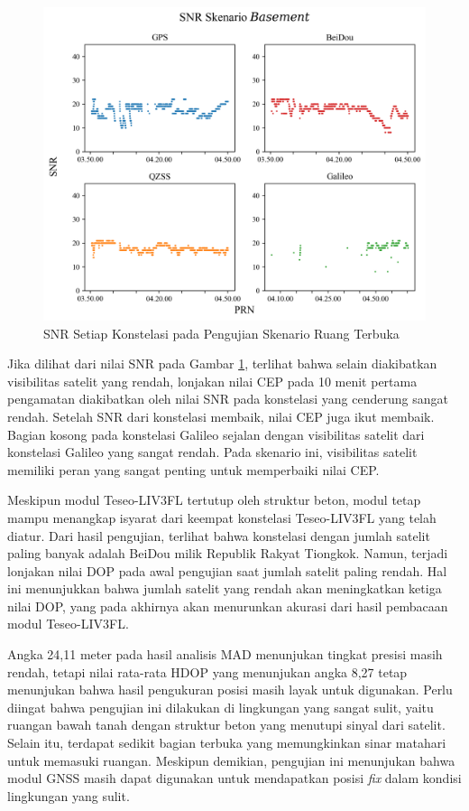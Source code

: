 \begin{figure}[H]
	\centering
	\includegraphics[width=13cm]{contents/chapter-4/1-skenario-basement/snr.png}
	\caption{SNR Setiap Konstelasi pada Pengujian Skenario Ruang Terbuka}
	\label{Fig: basement-snr}
\end{figure}

Jika dilihat dari nilai SNR pada Gambar \ref{Fig: basement-snr}, terlihat bahwa selain diakibatkan visibilitas satelit yang rendah, lonjakan nilai CEP pada 10 menit pertama pengamatan diakibatkan oleh nilai SNR pada konstelasi yang cenderung sangat rendah. Setelah SNR dari konstelasi membaik, nilai CEP juga ikut membaik. Bagian kosong pada konstelasi Galileo sejalan dengan visibilitas satelit dari konstelasi Galileo yang sangat rendah. Pada skenario ini, visibilitas satelit memiliki peran yang sangat penting untuk memperbaiki nilai CEP.

Meskipun modul Teseo-LIV3FL tertutup oleh struktur beton, modul tetap mampu menangkap isyarat dari keempat konstelasi Teseo-LIV3FL yang telah diatur. Dari hasil pengujian, terlihat bahwa konstelasi dengan jumlah satelit paling banyak adalah BeiDou milik Republik Rakyat Tiongkok. Namun, terjadi lonjakan nilai DOP pada awal pengujian saat jumlah satelit paling rendah. Hal ini menunjukkan bahwa jumlah satelit yang rendah akan meningkatkan ketiga nilai DOP, yang pada akhirnya akan menurunkan akurasi dari hasil pembacaan modul Teseo-LIV3FL.

Angka 24,11 meter pada hasil analisis MAD menunjukan tingkat presisi masih rendah, tetapi nilai rata-rata HDOP yang menunjukan angka 8,27 tetap menunjukan bahwa hasil pengukuran posisi masih layak untuk digunakan. Perlu diingat bahwa pengujian ini dilakukan di lingkungan yang sangat sulit, yaitu ruangan bawah tanah dengan struktur beton yang menutupi sinyal dari satelit. Selain itu, terdapat sedikit bagian terbuka yang memungkinkan sinar matahari untuk memasuki ruangan. Meskipun demikian, pengujian ini menunjukan bahwa modul GNSS masih dapat digunakan untuk mendapatkan posisi \textit{fix} dalam kondisi lingkungan yang sulit.

